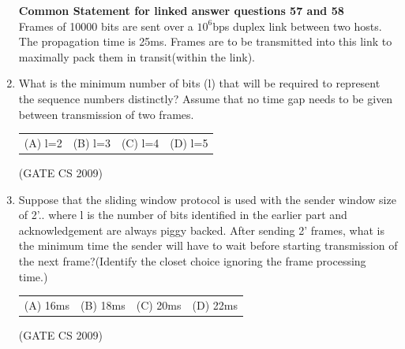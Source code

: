 \documentclass[a4paper, 11pt]{article}
\begin{document}
\begin{enumerate}
    {\Large \textbf{Common Statement for linked answer questions 57 and 58}} \\    
    Frames of 10000 bits are sent over a $10^6$bps duplex link between two hosts. The propagation time is 25ms. Frames are to be transmitted into this link to maximally pack them in transit(within the link).
    \item What is the minimum number of bits (l) that will be required to represent the sequence numbers distinctly? Assume that no time gap needs to be given between transmission of two frames.\\
    \begin{tabularx}{\textwidth}{@{}XXXX@{}}
       (A)  l=2  & (B) l=3 & (C) l=4 & (D) l=5  \\
    \end{tabularx}

    \hfill (GATE CS 2009)
    
    \item Suppose that the sliding window protocol is used with the sender window size of 2'.. where l is the number of bits identified in the earlier part and acknowledgement are always piggy backed. After sending 2' frames, what is the minimum time the sender will have to wait before starting transmission of the next frame?(Identify the closet choice ignoring the frame processing time.)\\
    \begin{tabularx}{\textwidth}{@{}XXXX@{}}
       (A)  16ms  & (B) 18ms & (C) 20ms & (D) 22ms  \\
    \end{tabularx}
    
    \hfill (GATE CS 2009)
    

\end{enumerate}
\end{document}

